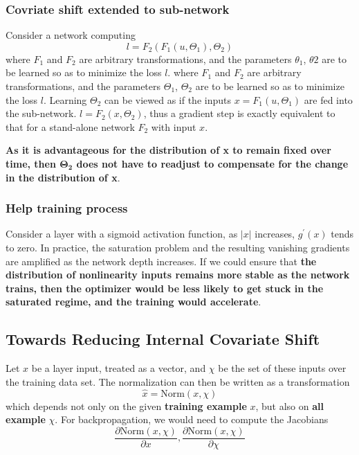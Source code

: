\documentclass[a3paper, 12pt]{book} %
\begin{document}
\subsubsection{Covriate shift extended to sub-network}
Consider a network computing 
$$l=F_2{(F_1{(u,\Theta_1)},\Theta_2)}$$
where $F_1$ and $F_2$ are arbitrary transformations, and the
parameters $\theta_1$, $\theta2$ are to be learned so as to minimize
the loss $l$.
where $F_1$ and $F_2$ are arbitrary transformations, and the parameters $\Theta_1$, $\Theta_2$ are to be learned so as to minimize the loss $l$. Learning $\Theta_2$ can be viewed as if the inputs $x=F_1{(u,\Theta_1)}$ are fed into the sub-network. $l=F_2{(x, \Theta_2)}$, thus a gradient step is exactly equivalent to that for a stand-alone network $F_2$ with input $x$. 

\textbf{As it is advantageous for the distribution of x to remain fixed over time, then $\mathbf{\Theta_2}$ does not have to readjust to compensate for the change in the distribution of x}.

\subsubsection{Help training process}
Consider a layer with a sigmoid activation function, as $|x|$ increases, $g^{'}{(x)}$ tends to zero. In practice, the saturation problem and the resulting vanishing gradients are amplified as the network depth increases. If we could ensure that \textbf{the distribution of nonlinearity inputs remains more stable as the network trains, then the optimizer would be less likely to get stuck in the saturated regime, and the training would accelerate}.

\subsection{Towards Reducing Internal Covariate Shift}
Let $x$ be a layer input, treated as a vector, and $\chi$ be the set of these inputs over the training data set. The normalization can then be written as a transformation
$$\hat{x}=\mathrm{Norm}{(x, \chi)}$$ which depends not only on the given \textbf{training example} $x$, but also on \textbf{all example} $\chi$. For backpropagation, we would need to compute the Jacobians
\begin{equation}
\frac{\partial{\mathrm{Norm}{(x,\chi)}}}{\partial{x}}, \frac{\partial{\mathrm{Norm}{(x,\chi)}}}{\partial{\chi}}
\end{equation} 
\end{document}
